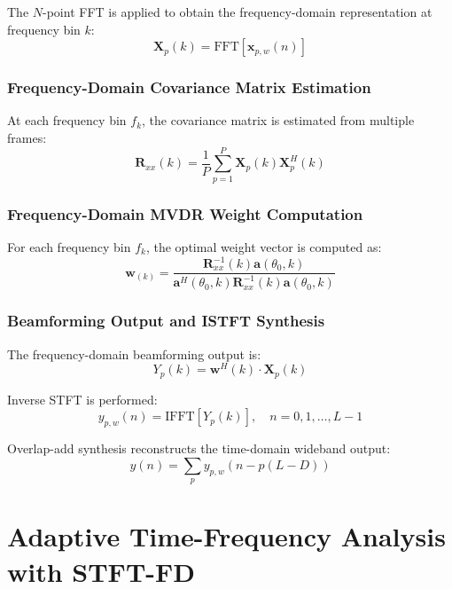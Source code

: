 \documentclass[journal]{IEEEtran}
\begin{document}
The $N$-point FFT is applied to obtain the frequency-domain representation at frequency bin $k$:
\begin{equation}
\boldsymbol{X}_p(k) = \text{FFT}\left[\boldsymbol{x}_{p,w}(n)\right]
\end{equation}

\subsubsection{Frequency-Domain Covariance Matrix Estimation}
At each frequency bin $f_k$, the covariance matrix is estimated from multiple frames:
\begin{equation}
\boldsymbol{R}_{xx}(k) = \frac{1}{P} \sum_{p=1}^{P} \boldsymbol{X}_p(k)\boldsymbol{X}_p^H(k)
\end{equation}

\subsubsection{Frequency-Domain MVDR Weight Computation}
For each frequency bin $f_k$, the optimal weight vector is computed as:
\begin{equation}
\boldsymbol{w}_{(k)} = \frac{\boldsymbol{R}_{xx}^{-1}(k)\boldsymbol{a}(\theta_0,k)}{\boldsymbol{a}^H(\theta_0,k)\boldsymbol{R}_{xx}^{-1}(k)\boldsymbol{a}(\theta_0,k)}
\end{equation}

\subsubsection{Beamforming Output and ISTFT Synthesis}
The frequency-domain beamforming output is:
\begin{equation}
Y_p(k) = \boldsymbol{w}^H(k) \cdot \boldsymbol{X}_p(k)
\end{equation}

Inverse STFT is performed:
\begin{equation}
y_{p,w}(n) = \text{IFFT}\left[Y_p(k)\right], \quad n = 0, 1, \ldots, L-1
\end{equation}

Overlap-add synthesis reconstructs the time-domain wideband output:
\begin{equation}
y(n) = \sum_{p} y_{p,w}\left(n - p(L - D)\right)
	\end{equation}


\section{Adaptive Time-Frequency Analysis with STFT-FD}
\label{stftfd}
\end{document}
